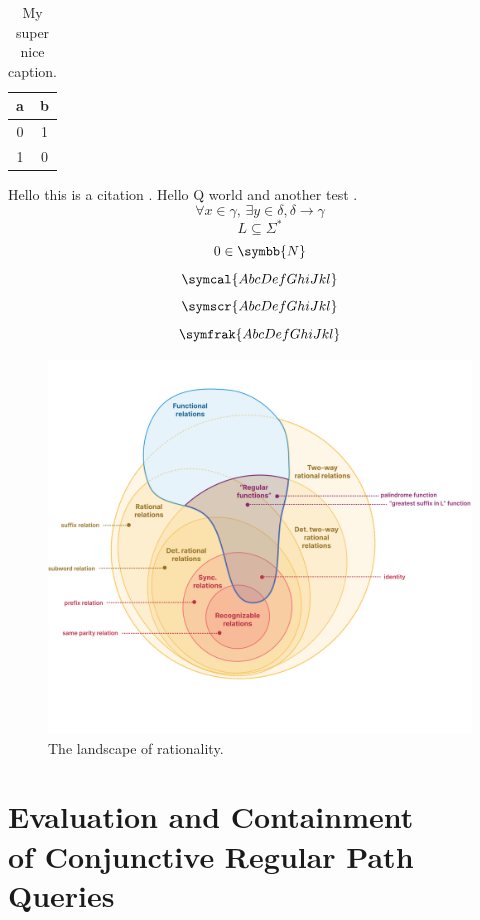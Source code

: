 \documentclass[a4paper,sfsidenotes,twoside,justified,nobib]{tufte-book-custom}
\begin{document}

\begin{table}
	\centering
	\begin{tabular}{cc}
		\toprule
		a & b \\ \midrule
		0 & 1 \\
		1 & 0 \\ \bottomrule
	\end{tabular}
	\caption{My super nice caption.}
\end{table}

\citereset
Hello this is a citation \autocite{Bringhurst2005}.
Hello Q world and another test \autocite{Bringhurst2005}.
\[\forall x \in \gamma,\, \exists y\in \delta, \delta \to \gamma\]
\[L \subseteq \Sigma^*\]
\[0 \in \symbb{N}\]
\[\symcal{AbcDefGhiJkl}\]
\[\symscr{AbcDefGhiJkl}\]
\[\symfrak{AbcDefGhiJkl}\]

\lipsum[1-2]

\begin{figure}[htb]
	\centering
	\includegraphics[width=\linewidth]{fig/landscape.png}
	\caption{The landscape of rationality.}
\end{figure}

\lipsum[3-10]

\chapter[Evaluation and Containment of Conjunctive Regular Path Queries]{Evaluation and Containment\\ of Conjunctive Regular Path Queries}
\end{document}
